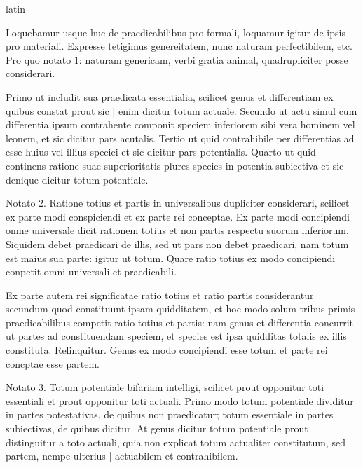 \begin{otherlanguage*}{latin}
\pstart
{}
\pend

\pstart
Loquebamur usque huc de praedicabilibus pro formali, loquamur igitur de ipsis pro materiali. Expresse tetigimus genereitatem, nunc naturam perfectibilem, etc. Pro quo notato 1:
naturam genericam, verbi gratia animal, quadrupliciter posse considerari. 
\pend

\pstart
Primo ut includit sua praedicata essentialia, scilicet genus et differentiam ex quibus constat prout sic \textnormal{|} enim dicitur totum actuale. Secundo ut actu simul cum differentia ipsum contrahente componit speciem inferiorem sibi vera hominem vel leonem, et sic dicitur pars acutalis. Tertio ut quid contrahibile per differentias ad esse huius vel illius speciei et sic dicitur pars potentialis. Quarto ut quid continens ratione suae superioritatis plures species in potentia subiectiva et sic denique dicitur totum potentiale. 
\pend

\pstart
Notato 2. Ratione totius et partis in universalibus dupliciter considerari, scilicet ex parte modi conspiciendi et ex parte rei conceptae. Ex parte modi concipiendi omne universale dicit rationem totius et non partis respectu suorum inferiorum. Siquidem debet praedicari de illis, sed ut pars non debet praedicari, nam totum est maius sua parte:
igitur ut totum. Quare ratio totius ex modo concipiendi conpetit omni universali et praedicabili. 
\pend

\pstart
Ex parte autem rei significatae ratio totius et ratio partis considerantur secundum quod constituunt ipsam quidditatem, et hoc modo solum tribus primis praedicabilibus competit ratio totius et partis:
nam genus et differentia concurrit ut partes ad constituendam speciem, et species est ipsa quidditas totalis ex illis constituta. Relinquitur. Genus ex modo concipiendi esse totum et parte rei concptae esse partem. 
\pend

\pstart
Notato 3. Totum potentiale bifariam intelligi, scilicet prout opponitur toti essentiali et prout opponitur toti actuali. Primo modo totum potentiale dividitur in partes potestativas, de quibus non praedicatur; totum essentiale in partes subiectivas, de quibus dicitur. At genus dicitur totum potentiale prout distinguitur a toto actuali, quia non explicat totum actualiter constitutum, sed partem, nempe ulterius \textnormal{|} actuabilem et contrahibilem. 
\pend


\end{otherlanguage*}
